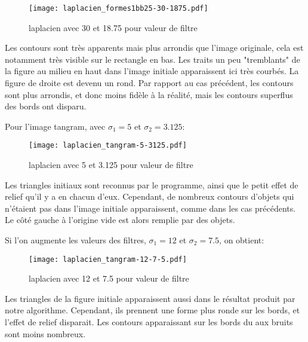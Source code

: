 \documentclass[12pt]{article}
\numberwithin{equation}{section}
\begin{document}
	\begin{figure}[!ht]
        \begin{center}
           \texttt{[image: laplacien\_formes1bb25-30-1875.pdf]} 
           \caption{laplacien avec 30 et 18.75 pour valeur de filtre}
        \end{center}
    \end{figure}

Les contours sont très apparents mais plus arrondis que l'image originale, cela est notamment très visible sur le rectangle en bas. Les traits un peu "tremblants" de la figure au milieu en haut dans l'image initiale apparaissent ici très courbés. La figure de droite est devenu un rond. Par rapport au cas précédent, les contours sont plus arrondis, et donc moins fidèle à la réalité, mais les contours superflus des bords ont disparu. 

Pour l'image tangram, avec $\sigma_1=5$ et $\sigma_2=3.125$:

	\begin{figure}[!ht]
        \begin{center}
           \texttt{[image: laplacien\_tangram-5-3125.pdf]} 
           \caption{laplacien avec 5 et 3.125 pour valeur de filtre}
        \end{center}
    \end{figure}

Les triangles initiaux sont reconnus par le programme, ainsi que le petit effet de relief qu'il y a en chacun d'eux. Cependant, de nombreux contours d'objets qui n'étaient pas dans l'image initiale apparaissent, comme dans les cas précédents. Le côté gauche à l'origine vide est alors remplie par des objets.

Si l'on augmente les valeurs des filtres, $\sigma_1=12$ et $\sigma_2=7.5$, on obtient:

	\begin{figure}[!ht]
        \begin{center}
           \texttt{[image: laplacien\_tangram-12-7-5.pdf]} 
           \caption{laplacien avec 12 et 7.5 pour valeur de filtre}
        \end{center}
    \end{figure}

Les triangles de la figure initiale apparaissent aussi dans le résultat produit par notre algorithme. Cependant, ils prennent une forme plus ronde sur les bords, et l'effet de relief disparait. Les contours apparaissant sur les bords du aux bruits sont moins nombreux.
\end{document}
